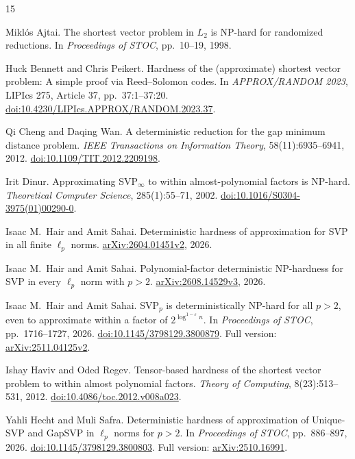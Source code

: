 \documentclass[11pt,letterpaper]{article}
\numberwithin{equation}{section}
\theoremstyle{definition}
\theoremstyle{remark}
\begin{document}
\begin{thebibliography}{15}
\raggedright
{}
Mikl\'os Ajtai.
The shortest vector problem in $L_2$ is NP-hard for randomized reductions.
In \emph{Proceedings of STOC}, pp.~10--19, 1998.

Huck Bennett and Chris Peikert.
Hardness of the (approximate) shortest vector problem: A simple proof via Reed--Solomon codes.
In \emph{APPROX/RANDOM 2023}, LIPIcs 275, Article 37, pp.~37:1--37:20.
\href{https://doi.org/10.4230/LIPIcs.APPROX/RANDOM.2023.37}{doi:10.4230/LIPIcs.APPROX/RANDOM.2023.37}.

Qi Cheng and Daqing Wan.
A deterministic reduction for the gap minimum distance problem.
\emph{IEEE Transactions on Information Theory}, 58(11):6935--6941, 2012.
\href{https://doi.org/10.1109/TIT.2012.2209198}{doi:10.1109/TIT.2012.2209198}.

Irit Dinur.
Approximating SVP$_\infty$ to within almost-polynomial factors is NP-hard.
\emph{Theoretical Computer Science}, 285(1):55--71, 2002.
\href{https://doi.org/10.1016/S0304-3975(01)00290-0}{doi:10.1016/S0304-3975(01)00290-0}.

Isaac M.~Hair and Amit Sahai.
Deterministic hardness of approximation for SVP in all finite $\ell_p$ norms.
\href{https://arxiv.org/abs/2604.01451v2}{arXiv:2604.01451v2}, 2026.

Isaac M.~Hair and Amit Sahai.
Polynomial-factor deterministic NP-hardness for SVP in every $\ell_p$ norm with $p>2$.
\href{https://arxiv.org/abs/2608.14529v3}{arXiv:2608.14529v3}, 2026.

Isaac M.~Hair and Amit Sahai.
SVP$_p$ is deterministically NP-hard for all $p>2$, even to approximate within a factor of $2^{\log^{1-\varepsilon}n}$.
In \emph{Proceedings of STOC}, pp.~1716--1727, 2026.
\href{https://doi.org/10.1145/3798129.3800879}{doi:10.1145/3798129.3800879}.
Full version: \href{https://arxiv.org/abs/2511.04125v2}{arXiv:2511.04125v2}.

Ishay Haviv and Oded Regev.
Tensor-based hardness of the shortest vector problem to within almost polynomial factors.
\emph{Theory of Computing}, 8(23):513--531, 2012.
\href{https://doi.org/10.4086/toc.2012.v008a023}{doi:10.4086/toc.2012.v008a023}.

Yahli Hecht and Muli Safra.
Deterministic hardness of approximation of Unique-SVP and GapSVP in $\ell_p$ norms for $p>2$.
In \emph{Proceedings of STOC}, pp.~886--897, 2026.
\href{https://doi.org/10.1145/3798129.3800803}{doi:10.1145/3798129.3800803}.
Full version: \href{https://arxiv.org/abs/2510.16991}{arXiv:2510.16991}.


\end{thebibliography}
\end{document}
